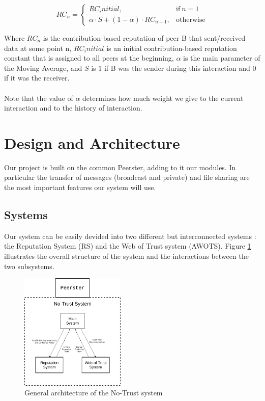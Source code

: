 \documentclass[]{article}
\begin{document}
\begin{equation}
    \label{eq:contr-rep}
    RC_n =
    \begin{cases}
        RC_initial,                                     & \text{if}\ n = 1
        \\
        \alpha \cdot S + (1 - \alpha) \cdot RC_{n - 1}, & \text{otherwise}
    \end{cases}
\end{equation}

\noindent
Where $RC_n$ is the contribution-based reputation of peer B that sent/received data at some point n, $RC_initial$ is an initial contribution-based reputation constant that is assigned to all peers at the beginning, $\alpha$ is the main parameter of the Moving Average, and $S$ is $1$ if B was the sender during this interaction and $0$ if it was the receiver.
\\\\
Note that the value of $\alpha$ determines how much weight we give to the current interaction and to the history of interaction.

\section{Design and Architecture}

Our project is built on the common Peerster, adding to it our modules. In particular the transfer of messages (broadcast and private) and file sharing are the most important features our system will use.

\subsection{Systems}
Our system can be easily devided into two different but interconnected systems : the Reputation System (RS) and the Web of Trust system (AWOTS). \newline
Figure \ref{fig:no-trust-arch} illustrates the overall structure of the system and the interactions between the two subsystems.

\begin{figure}[h]
	\includegraphics[width=50mm]{no-trust-arch}
	\centering
	\caption{General architecture of the No-Trust system}
	\label{fig:no-trust-arch}
\end{figure}
\end{document}
